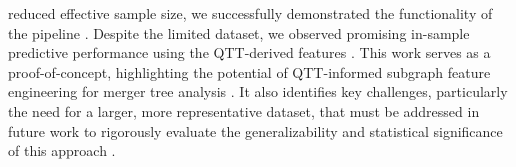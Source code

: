 \documentclass[twocolumn]{aastex631}
\begin{document}
reduced effective sample size, we successfully demonstrated the functionality of the pipeline \citep{jung2024mergertreebasedgalaxymatching}. Despite the limited dataset, we observed promising in-sample predictive performance using the QTT-derived features \citep{jespersen2022textttmangrovelearninggalaxyproperties}. This work serves as a proof-of-concept, highlighting the potential of QTT-informed subgraph feature engineering for merger tree analysis \citep{jespersen2022textttmangrovelearninggalaxyproperties,jung2024mergertreebasedgalaxymatching}. It also identifies key challenges, particularly the need for a larger, more representative dataset, that must be addressed in future work to rigorously evaluate the generalizability and statistical significance of this approach \citep{jung2024mergertreebasedgalaxymatching}.
\end{document}
